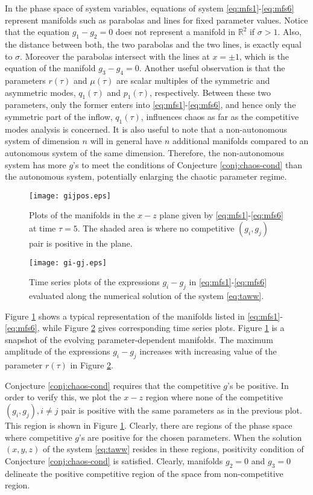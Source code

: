In the phase space of system variables, equations of system \eqref{eq:mfs1}-\eqref{eq:mfs6} represent 
manifolds such as parabolas and lines for fixed parameter values. Notice that the equation $g_1-g_2=0$ does not represent a manifold in $\mathbb{R}^2$ if $\sigma >1$. Also, the distance between both, the two parabolas and the two lines, is exactly equal to $\sigma$. Moreover the parabolas intersect with the lines at $x=\pm 1$, which is the equation of the manifold $g_3-g_4=0$. Another useful observation is that the parameters $r(\tau)$ and $\mu(\tau)$ are scalar multiples of the symmetric and asymmetric modes, $q_1(\tau)$ and $p_1(\tau)$, respectively. Between these two parameters, only the former enters into \eqref{eq:mfs1}-\eqref{eq:mfs6}, and hence only the symmetric part of the inflow, $q_1(\tau)$, influences chaos as far as the competitive modes analysis is concerned. It is also useful to note that a non-autonomous system of dimension $n$ will in general have $n$ additional manifolds compared to an autonomous system of the same dimension. Therefore, the non-autonomous system has more $g$'s to meet the conditions of Conjecture \ref{conj:chaos-cond} than the autonomous system, potentially enlarging the chaotic parameter regime.


\begin{figure}
\centering
\texttt{[image: gijpos.eps]}
\caption{Plots of the manifolds in the $x-z$ plane given by \eqref{eq:mfs1}-\eqref{eq:mfs6} at time $\tau=5$. The shaded area is where no competitive $(g_i,g_j)$ pair is positive in the plane.}
 \label{fig:gijpos}
\end{figure}

\begin{figure}
\centering
\texttt{[image: gi-gj.eps]}
\caption{Time series plots of the expressions $g_i -g_j$ in \eqref{eq:mfs1}-\eqref{eq:mfs6} evaluated along the numerical solution of the system \eqref{eq:taww}.}
 \label{fig:gi-gj}
\end{figure}

Figure \ref{fig:gijpos} shows a typical representation of the
manifolds listed in \eqref{eq:mfs1}-\eqref{eq:mfs6}, while Figure \ref{fig:gi-gj} gives corresponding time series plots. Figure \ref{fig:gijpos} is a snapshot of the evolving parameter-dependent manifolds. The maximum amplitude of the expressions $g_i - g_j$ increases with increasing value of the parameter $r(\tau)$ in Figure \ref{fig:gi-gj}.

Conjecture \ref{conj:chaos-cond} requires that the competitive $g$'s be positive. In order 
to verify this, we plot the $x-z$ region where none of the competitive 
$(g_i,g_j),i\neq j$ pair is positive with the same parameters as in the previous 
plot. This region is shown in Figure \ref{fig:gijpos}. Clearly, there are regions of 
the phase space where competitive $g$'s are positive for the chosen parameters. When the solution 
$(x,y,z)$ of the system \eqref{eq:taww} resides in these regions, positivity 
condition of Conjecture \ref{conj:chaos-cond} is satisfied. Clearly, manifolds $g_2=0$ and $g_3=0$ delineate the positive competitive region of the space from non-competitive region.

